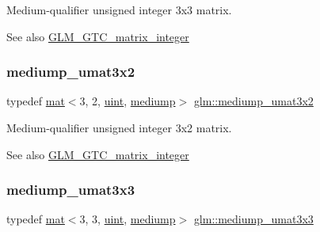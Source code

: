 Medium-\/qualifier unsigned integer 3x3 matrix. \begin{DoxySeeAlso}{See also}
\hyperlink{group__gtc__matrix__integer}{G\+L\+M\+\_\+\+G\+T\+C\+\_\+matrix\+\_\+integer} 
\end{DoxySeeAlso}
\mbox{\label{group__gtc__matrix__integer_gad27333d041d86c7b0b78010c5a437846}} 
\subsubsection{\texorpdfstring{mediump\+\_\+umat3x2}{mediump\_umat3x2}}
{\footnotesize\ttfamily typedef \hyperlink{structglm_1_1mat}{mat}$<$3, 2, \hyperlink{group__core__precision_ga4fd29415871152bfb5abd588334147c8}{uint}, \hyperlink{namespaceglm_a36ed105b07c7746804d7fdc7cc90ff25a6416f3ea0c9025fb21ed50c4d6620482}{mediump}$>$ \hyperlink{group__gtc__matrix__integer_gad27333d041d86c7b0b78010c5a437846}{glm\+::mediump\+\_\+umat3x2}}

Medium-\/qualifier unsigned integer 3x2 matrix. \begin{DoxySeeAlso}{See also}
\hyperlink{group__gtc__matrix__integer}{G\+L\+M\+\_\+\+G\+T\+C\+\_\+matrix\+\_\+integer} 
\end{DoxySeeAlso}
\mbox{\label{group__gtc__matrix__integer_gac2563a9d45e3f6be0ceaf62b50a983f5}} 
\subsubsection{\texorpdfstring{mediump\+\_\+umat3x3}{mediump\_umat3x3}}
{\footnotesize\ttfamily typedef \hyperlink{structglm_1_1mat}{mat}$<$3, 3, \hyperlink{group__core__precision_ga4fd29415871152bfb5abd588334147c8}{uint}, \hyperlink{namespaceglm_a36ed105b07c7746804d7fdc7cc90ff25a6416f3ea0c9025fb21ed50c4d6620482}{mediump}$>$ \hyperlink{group__gtc__matrix__integer_gac2563a9d45e3f6be0ceaf62b50a983f5}{glm\+::mediump\+\_\+umat3x3}}

